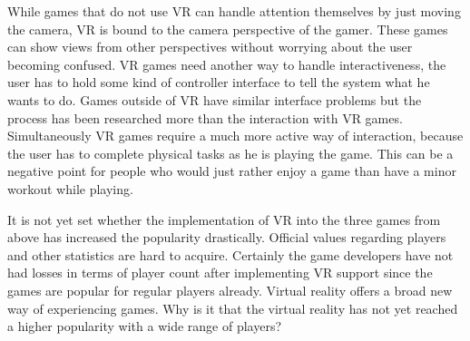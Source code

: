 While games that do not use VR can handle attention themselves by just moving the camera, VR is bound to the camera perspective of the gamer. These games can show views from other perspectives without worrying about the user becoming confused. VR games need another way to handle interactiveness, the user has to hold some kind of controller interface to tell the system what he wants to do. Games outside of VR have similar interface problems but the process has been researched more than the interaction with VR games. Simultaneously VR games require a much more active way of interaction, because the user has to complete physical tasks as he is playing the game. This can be a negative point for people who would just rather enjoy a game than have a minor workout while playing.

It is not yet set whether the implementation of VR into the three games from above has increased the popularity drastically. Official values regarding players and other statistics are hard to acquire. Certainly the game developers have not had losses in terms of player count after implementing VR support since the games are popular for regular players already. \newline
Virtual reality offers a broad new way of experiencing games. Why is it that the virtual reality has not yet reached a higher popularity with a wide range of players?

\divider

